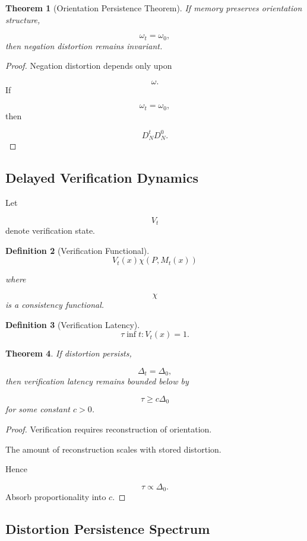 \documentclass[12pt]{article}
\newtheorem{theorem}{Theorem}[section]
\newtheorem{definition}[theorem]{Definition}
\theoremstyle{remark}
\begin{document}
\begin{theorem}[Orientation Persistence Theorem]
If memory preserves orientation structure,

\[
\omega_t=\omega_0,
\]
then negation distortion remains invariant.
\end{theorem}

\begin{proof}
Negation distortion depends only upon

\[
\omega.
\]
If

\[
\omega_t=\omega_0,
\]
then

\[
D_N^t
D_N^0.
\]
\end{proof}

\subsection{Delayed Verification Dynamics}

Let

\[
V_t
\]
denote verification state.

\begin{definition}[Verification Functional]
\[
V_t(x)
\chi(P,M_t(x))
\]

where

\[
\chi
\]
is a consistency functional.
\end{definition}

\begin{definition}[Verification Latency]
\[
\tau
\inf
{
t:
V_t(x)=1
}.
\]
\end{definition}

\begin{theorem}
If distortion persists,

\[
\Delta_t=\Delta_0,
\]
then verification latency remains bounded below by

\[
\tau
\ge
c\Delta_0
\]
for some constant \(c>0\).
\end{theorem}

\begin{proof}
Verification requires reconstruction of orientation.

The amount of reconstruction scales with stored distortion.

Hence

\[
\tau
\propto
\Delta_0.
\]
Absorb proportionality into \(c\).
\end{proof}

\subsection{Distortion Persistence Spectrum}
\end{document}
